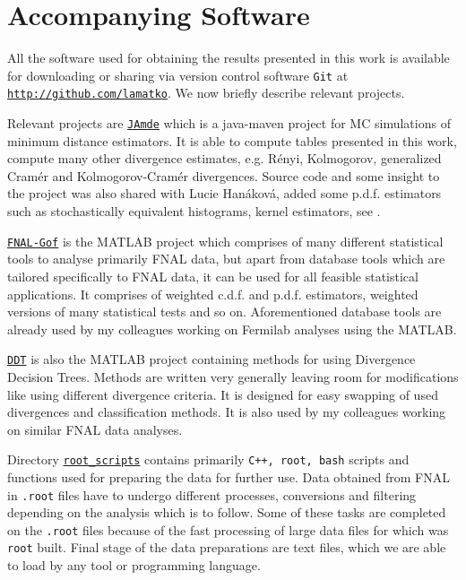 \chapter{Accompanying Software}\label{ch:software}

All the software used for obtaining the results presented in this work is available for downloading or sharing via version control software \texttt{Git} at \href{https://github.com/lamatko}{\texttt{http://github.com/lamatko}}. We now briefly describe relevant projects.

Relevant projects are \href{https://github.com/lamatko/JAmde}{\texttt{JAmde}} which is a java-maven project for MC simulations of minimum distance estimators. It is able to compute tables presented in this work, compute many other divergence estimates, e.g. R\'enyi, Kolmogorov, generalized Cram\'er and Kolmogorov-Cram\'er divergences. Source code and some insight to the project was also shared with Lucie Han\'akov\'a, added some p.d.f. estimators such as stochastically equivalent histograms, kernel estimators, see \cite{Hanakova}.

\href{https://github.com/lamatko/FNAL-Gof}{\texttt{FNAL-Gof}} is the MATLAB project which comprises of many different statistical tools to analyse primarily FNAL data, but apart from database tools which are tailored specifically to FNAL data, it can be used for all feasible statistical applications. It comprises of weighted c.d.f. and p.d.f. estimators, weighted versions of many statistical tests and so on. Aforementioned database tools are already used by my colleagues working on Fermilab analyses using the MATLAB.

\href{https://github.com/lamatko/DDT}{\texttt{DDT}} is also the MATLAB project containing methods for using Divergence Decision Trees. Methods are written very generally leaving room for modifications like using different divergence criteria. It is designed for easy swapping of used divergences and classification methods. It is also used by my colleagues working on similar FNAL data analyses.

Directory \href{https://github.com/lamatko/root_scripts}{\texttt{root\_scripts}} contains primarily \texttt{C++, root, bash} scripts  and functions used for preparing the data for further use. Data obtained from FNAL in \texttt{.root} files have to undergo different processes, conversions and filtering depending on the analysis which is to follow. Some of these tasks are completed on the \texttt{.root} files because of the fast processing of large data files for which was \texttt{root} built. Final stage of the data preparations are text files, which we are able to load by any tool or programming language.

